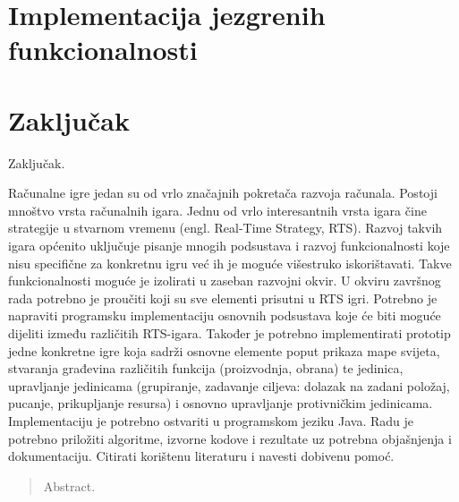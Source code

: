 \documentclass[times, utf8, zavrsni, numeric]{fer}
\begin{document}
\chapter{Implementacija jezgrenih funkcionalnosti}

\chapter{Zaključak}
Zaključak.


 

\begin{sazetak}
Računalne igre jedan su od vrlo značajnih pokretača razvoja računala. Postoji mnoštvo vrsta računalnih igara. Jednu od vrlo interesantnih vrsta igara čine strategije u stvarnom vremenu (engl. Real-Time Strategy, RTS). Razvoj takvih igara općenito uključuje pisanje mnogih podsustava i razvoj funkcionalnosti koje nisu specifične za konkretnu igru već ih je moguće višestruko iskorištavati. Takve funkcionalnosti moguće je izolirati u zaseban razvojni okvir. U okviru završnog rada potrebno je proučiti koji su sve elementi prisutni u RTS igri. Potrebno je napraviti programsku implementaciju osnovnih podsustava koje će biti moguće dijeliti između različitih RTS-igara. Također je potrebno implementirati prototip jedne konkretne igre koja sadrži osnovne elemente poput prikaza mape svijeta, stvaranja građevina različitih funkcija (proizvodnja, obrana) te jedinica, upravljanje jedinicama (grupiranje, zadavanje ciljeva: dolazak na zadani položaj, pucanje, prikupljanje resursa) i osnovno upravljanje protivničkim jedinicama. Implementaciju je potrebno ostvariti u programskom jeziku Java. Radu je potrebno priložiti algoritme, izvorne kodove i rezultate uz potrebna objašnjenja i dokumentaciju. Citirati korištenu literaturu i navesti dobivenu pomoć.

\end{sazetak}

\begin{abstract}
Abstract.

\end{abstract}
\end{document}
